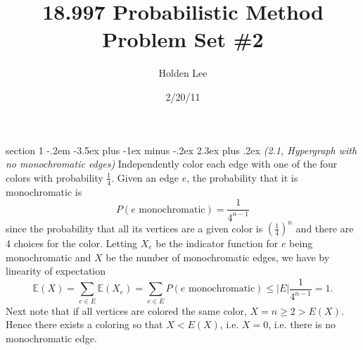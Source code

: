 \documentclass[12pt]{article}
\makeatletter
\theoremstyle{norm}
\newcommand{\E}[0]{\mathbb{E}}
\newcommand{\rc}[1]{\frac{1}{#1}}
\newcommand{\pa}[1]{\left( {#1} \right)}
\newenvironment{problem}{\@startsection
       {section}
       {1}
       {-.2em}
       {-3.5ex plus -1ex minus -.2ex}
       {2.3ex plus .2ex}
       {\pagebreak[3]%
       \large\bf\noindent{Problem }
       }
       }
       {%
       }
\makeatother
\begin{document}
\title{18.997 Probabilistic Method Problem Set \#2}%
\author{Holden Lee}
\date{2/20/11}%
\maketitle
\thispagestyle{empty}

\begin{problem}{\it (2.1, Hypergraph with no monochromatic edges)}
Independently color each edge with one of the four colors with probability $\rc 4$. Given an edge $e$, the probability that it is monochromatic is 
\[
P(e \text{ monochromatic})=\rc{4^{n-1}}
\]
since the probability that all its vertices are a given color is $\pa{\rc{4}}^n$ and there are 4 choices for the color. Letting $X_e$ be the indicator function for $e$ being monochromatic and $X$ be the number of monochromatic edges, we have by linearity of expectation
\[
\E(X)=\sum_{e\in E} \E(X_e)=\sum_{e\in E}P(e \text{ monochromatic})\leq |E|\rc{4^{n-1}}=1.
\]
Next note that if all vertices are colored the same color, $X=n\geq 2>E(X)$. Hence there exists a coloring so that $X<E(X)$, i.e. $X=0$, i.e. there is no monochromatic edge.
\end{problem}
\end{document}
